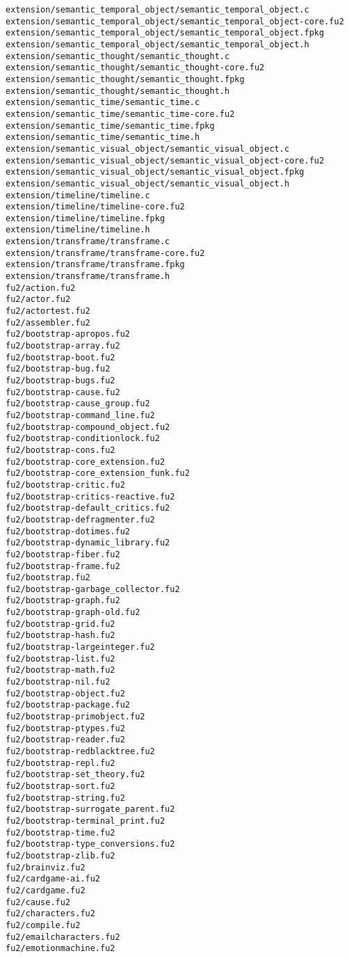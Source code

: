 \begin{lstlisting}
extension/semantic_temporal_object/semantic_temporal_object.c
extension/semantic_temporal_object/semantic_temporal_object-core.fu2
extension/semantic_temporal_object/semantic_temporal_object.fpkg
extension/semantic_temporal_object/semantic_temporal_object.h
extension/semantic_thought/semantic_thought.c
extension/semantic_thought/semantic_thought-core.fu2
extension/semantic_thought/semantic_thought.fpkg
extension/semantic_thought/semantic_thought.h
extension/semantic_time/semantic_time.c
extension/semantic_time/semantic_time-core.fu2
extension/semantic_time/semantic_time.fpkg
extension/semantic_time/semantic_time.h
extension/semantic_visual_object/semantic_visual_object.c
extension/semantic_visual_object/semantic_visual_object-core.fu2
extension/semantic_visual_object/semantic_visual_object.fpkg
extension/semantic_visual_object/semantic_visual_object.h
extension/timeline/timeline.c
extension/timeline/timeline-core.fu2
extension/timeline/timeline.fpkg
extension/timeline/timeline.h
extension/transframe/transframe.c
extension/transframe/transframe-core.fu2
extension/transframe/transframe.fpkg
extension/transframe/transframe.h
fu2/action.fu2
fu2/actor.fu2
fu2/actortest.fu2
fu2/assembler.fu2
fu2/bootstrap-apropos.fu2
fu2/bootstrap-array.fu2
fu2/bootstrap-boot.fu2
fu2/bootstrap-bug.fu2
fu2/bootstrap-bugs.fu2
fu2/bootstrap-cause.fu2
fu2/bootstrap-cause_group.fu2
fu2/bootstrap-command_line.fu2
fu2/bootstrap-compound_object.fu2
fu2/bootstrap-conditionlock.fu2
fu2/bootstrap-cons.fu2
fu2/bootstrap-core_extension.fu2
fu2/bootstrap-core_extension_funk.fu2
fu2/bootstrap-critic.fu2
fu2/bootstrap-critics-reactive.fu2
fu2/bootstrap-default_critics.fu2
fu2/bootstrap-defragmenter.fu2
fu2/bootstrap-dotimes.fu2
fu2/bootstrap-dynamic_library.fu2
fu2/bootstrap-fiber.fu2
fu2/bootstrap-frame.fu2
fu2/bootstrap.fu2
fu2/bootstrap-garbage_collector.fu2
fu2/bootstrap-graph.fu2
fu2/bootstrap-graph-old.fu2
fu2/bootstrap-grid.fu2
fu2/bootstrap-hash.fu2
fu2/bootstrap-largeinteger.fu2
fu2/bootstrap-list.fu2
fu2/bootstrap-math.fu2
fu2/bootstrap-nil.fu2
fu2/bootstrap-object.fu2
fu2/bootstrap-package.fu2
fu2/bootstrap-primobject.fu2
fu2/bootstrap-ptypes.fu2
fu2/bootstrap-reader.fu2
fu2/bootstrap-redblacktree.fu2
fu2/bootstrap-repl.fu2
fu2/bootstrap-set_theory.fu2
fu2/bootstrap-sort.fu2
fu2/bootstrap-string.fu2
fu2/bootstrap-surrogate_parent.fu2
fu2/bootstrap-terminal_print.fu2
fu2/bootstrap-time.fu2
fu2/bootstrap-type_conversions.fu2
fu2/bootstrap-zlib.fu2
fu2/brainviz.fu2
fu2/cardgame-ai.fu2
fu2/cardgame.fu2
fu2/cause.fu2
fu2/characters.fu2
fu2/compile.fu2
fu2/emailcharacters.fu2
fu2/emotionmachine.fu2

\end{lstlisting}
